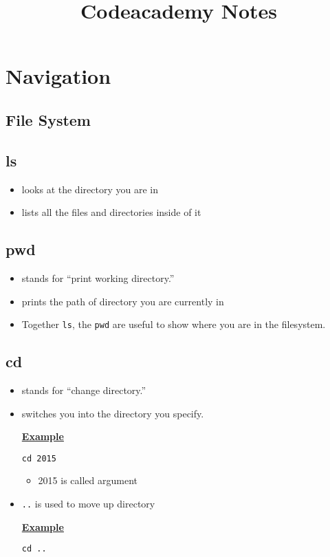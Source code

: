 \documentclass[12pt]{article}
\begin{document}
\title{Codeacademy Notes}

\section{Navigation}
\subsection{File System}

\subsection{ls}
\begin{itemize}
    \item looks at the directory you are in
    \item lists all the files and directories inside of it
\end{itemize}

\subsection{pwd}
\begin{itemize}
    \item stands for “print working directory.”
    \item prints the path of directory you are currently in
    \item Together \texttt{ls}, the \texttt{pwd} are useful to show where you are in the filesystem.
\end{itemize}

\subsection{cd}
\begin{itemize}
    \item stands for “change directory.”
    \item switches you into the directory you specify.

    \bigskip

    \underline{\textbf{Example}}

    \texttt{cd 2015}

    \begin{itemize}
        \item 2015 is called argument
    \end{itemize}
    \item \texttt{..} is used to move up directory
    \bigskip

    \underline{\textbf{Example}}

    \texttt{cd ..}
\end{itemize}
\end{document}
